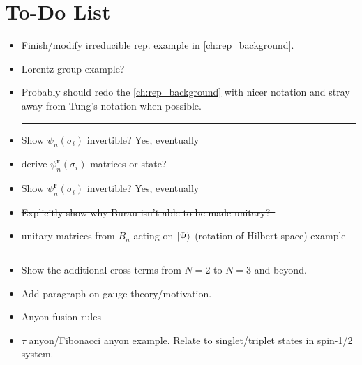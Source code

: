 \chapter{To-Do List}\label{ch:todo}

\begin{itemize}
    \item Finish/modify irreducible rep. example in \cref{ch:rep_background}.
    \item Lorentz group example?
    \item Probably should redo the \cref{ch:rep_background} with nicer notation and stray away from Tung's notation when possible.
    
    \begin{center}\rule{.85\textwidth}{0.65pt}\end{center}
    
    \item Show $\psi_n(\sigma_i)$ invertible? Yes, eventually
    \item derive $\psi_n^\textbf{r}(\sigma_i)$ matrices or state?
    \item Show $\psi_n^\textbf{r}(\sigma_i)$ invertible? Yes, eventually
    \item \sout{Explicitly show why Burau isn't able to be made unitary?~\cite{Delaney2016}}
    \item unitary matrices from $B_n$ acting on $\ket{\Psi}$ (rotation of Hilbert space) example
    
    \begin{center}\rule{.85\textwidth}{0.65pt}\end{center}
    
    \item Show the additional cross terms from $N=2$ to $N=3$ and beyond.
    \item Add paragraph on gauge theory/motivation.
    \item Anyon fusion rules
    \item $\tau$ anyon/Fibonacci anyon example. Relate to singlet/triplet states in spin-1/2 system.
\end{itemize}
